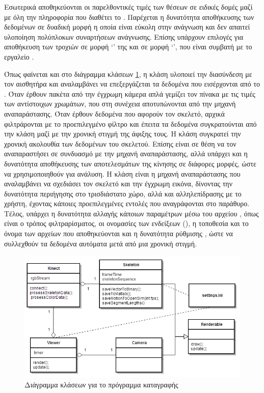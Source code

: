 Εσωτερικά αποθηκεύονται οι παρελθοντικές τιμές των θέσεων σε ειδικές δομές μαζί με όλη την πληροφορία που διαθέτει το . Παρέχεται η δυνατότητα αποθήκευσης των δεδομένων σε δυαδική μορφή η οποία είναι εύκολη στην ανάγνωση και δεν απαιτεί υλοποίηση πολύπλοκων συναρτήσεων ανάγνωσης. Επίσης υπάρχουν επιλογές για αποθήκευση των τροχιών σε μορφή \lq {}\rq\; της  και σε μορφή \lq {}\rq  , που είναι συμβατή με το εργαλείο .

Όπως φαίνεται και στο διάγραμμα κλάσεων \ref{fig:motion-capture-class-diagram}, η κλάση  υλοποιεί την διασύνδεση με τον αισθητήρα και αναλαμβάνει να επεξεργάζεται τα δεδομένα που εισέρχονται από το . Όταν έρθουν πακέτα από την έγχρωμη κάμερα απλά γεμίζει τον πίνακα  με τις τιμές των αντίστοιχων χρωμάτων, που στη συνέχεια αποτυπώνονται από την μηχανή αναπαράστασης. Όταν έρθουν δεδομένα που αφορούν τον σκελετό, αρχικά φιλτράρονται με το προεπιλεγμένο φίλτρο και έπειτα τα δεδομένα συγκρατούνται από την κλάση  μαζί με την χρονική στιγμή της άφιξης τους. Η κλάση  συγκρατεί την χρονική ακολουθία των δεδομένων του σκελετού. Επίσης είναι σε θέση να τον αναπαραστήσει σε συνδυασμό με την μηχανή αναπαράστασης, αλλά υπάρχει και η δυνατότητα αποθήκευσης των αποτελεσμάτων της κίνησης σε διάφορες μορφές, ώστε να χρησιμοποιηθούν για ανάλυση. Η κλάση  είναι η μηχανή αναπαράστασης που αναλαμβάνει να σχεδιάσει τον σκελετό και την έγχρωμη εικόνα, δίνοντας την δυνατότητα περιήγησης στο τρισδιάστατο χώρο, αλλά και αλληλεπίδρασης με το χρήστη, έχοντας κάποιες προεπιλεγμένες εντολές που αναγράφονται στο παράθυρο. Τέλος, υπάρχει η δυνατότητα αλλαγής κάποιων παραμέτρων μέσω του αρχείου , όπως είναι ο τρόπος φιλτραρίσματος, οι ονομασίες των ενδείξεων (), η τοποθεσία και το όνομα των αρχείων που αποθηκεύονται και η δυνατότητα ρύθμισης , ώστε να συλλεχθούν τα δεδομένα αυτόματα μετά από μια χρονική στιγμή.

\begin{figure}[H]
    \centering
    \includegraphics[width=.9\textwidth, keepaspectratio]{fig/motion-capture-class-diagram.png}
    \caption{Διάγραμμα κλάσεων για το πρόγραμμα καταγραφής}
    \label{fig:motion-capture-class-diagram}
\end{figure}

